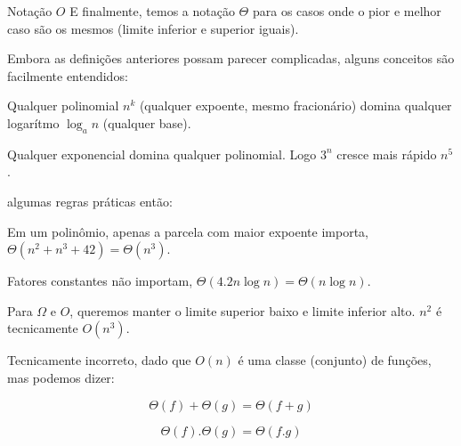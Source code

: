 \documentclass{beamer}
\begin{document}
\begin{frame}{Notação $O$}
  E finalmente, temos a notação $\Theta$ para os casos onde o pior e
  melhor caso são os mesmos (limite inferior e superior iguais).

  \framebreak

  Embora as definições anteriores possam parecer complicadas, alguns
  conceitos são facilmente entendidos:

  Qualquer polinomial $n^k$ (qualquer expoente, mesmo fracionário)
  domina qualquer logarítmo $\log_a n$ (qualquer base).

  Qualquer exponencial domina qualquer polinomial. Logo $3^n$ cresce
  mais rápido $n^5$.

  \framebreak

  algumas regras práticas então:

  Em um polinômio, apenas a parcela com maior expoente
  importa, $\Theta(n^2 + n^3 + 42) = \Theta(n^3)$.

  Fatores constantes não importam,
  $\Theta(4.2 n \log n) = \Theta(n \log n)$.

  Para $\Omega$ e $O$, queremos manter o limite superior baixo e
  limite inferior alto. $n^2$ é tecnicamente $O(n^3)$.

  \framebreak

  Tecnicamente incorreto, dado que $O(n)$ é uma classe (conjunto) de
  funções, mas podemos dizer:

  \[
    \Theta(f) + \Theta(g) = \Theta(f + g)
  \]

  \[
    \Theta(f) . \Theta(g) = \Theta(f . g)
  \]
  
\end{frame}
\end{document}
